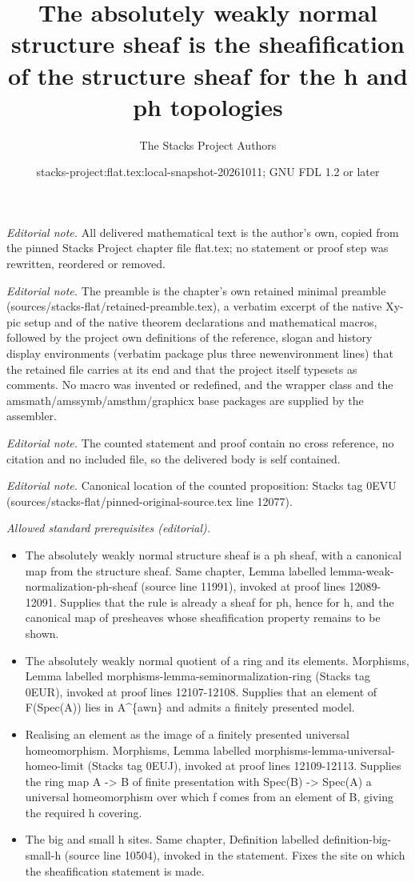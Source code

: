 \documentclass[10pt,a4paper]{amsart}
\title{The absolutely weakly normal structure sheaf is the sheafification of the structure sheaf for the h and ph topologies}
\author{The Stacks Project Authors}
\date{stacks-project:flat.tex:local-snapshot-20261011; GNU FDL 1.2 or later}
\theoremstyle{plain}
\theoremstyle{definition}
\theoremstyle{remark}
\numberwithin{equation}{subsection}
\begin{document}
\maketitle
\noindent\textit{Editorial note.} All delivered mathematical text is the author's own, copied from the pinned Stacks Project chapter file flat.tex; no statement or proof step was rewritten, reordered or removed.\par\medskip
\noindent\textit{Editorial note.} The preamble is the chapter's own retained minimal preamble (sources/stacks-flat/retained-preamble.tex), a verbatim excerpt of the native Xy-pic setup and of the native theorem declarations and mathematical macros, followed by the project own definitions of the reference, slogan and history display environments (verbatim package plus three newenvironment lines) that the retained file carries at its end and that the project itself typesets as comments. No macro was invented or redefined, and the wrapper class and the amsmath/amssymb/amsthm/graphicx base packages are supplied by the assembler.\par\medskip
\noindent\textit{Editorial note.} The counted statement and proof contain no cross reference, no citation and no included file, so the delivered body is self contained.\par\medskip
\noindent\textit{Editorial note.} Canonical location of the counted proposition: Stacks tag 0EVU (sources/stacks-flat/pinned-original-source.tex line 12077).\par\medskip
\noindent\textit{Allowed standard prerequisites (editorial).}\begin{itemize}
\item The absolutely weakly normal structure sheaf is a ph sheaf, with a canonical map from the structure sheaf. Same chapter, Lemma labelled lemma-weak-normalization-ph-sheaf (source line 11991), invoked at proof lines 12089-12091. Supplies that the rule is already a sheaf for ph, hence for h, and the canonical map of presheaves whose sheafification property remains to be shown.
\item The absolutely weakly normal quotient of a ring and its elements. Morphisms, Lemma labelled morphisms-lemma-seminormalization-ring (Stacks tag 0EUR), invoked at proof lines 12107-12108. Supplies that an element of F(Spec(A)) lies in A\textasciicircum{}\{awn\} and admits a finitely presented model.
\item Realising an element as the image of a finitely presented universal homeomorphism. Morphisms, Lemma labelled morphisms-lemma-universal-homeo-limit (Stacks tag 0EUJ), invoked at proof lines 12109-12113. Supplies the ring map A -> B of finite presentation with Spec(B) -> Spec(A) a universal homeomorphism over which f comes from an element of B, giving the required h covering.
\item The big and small h sites. Same chapter, Definition labelled definition-big-small-h (source line 10504), invoked in the statement. Fixes the site on which the sheafification statement is made.
\end{itemize}\medskip
\end{document}
